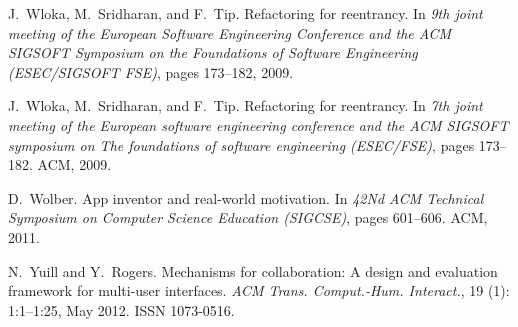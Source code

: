 \documentclass[article]{sigplanconf}
\begin{document}
\begin{thebibliography}{10}
J.~Wloka, M.~Sridharan, and F.~Tip.
\newblock Refactoring for reentrancy.
\newblock In \emph{9th joint meeting of the European Software Engineering
  Conference and the ACM SIGSOFT Symposium on the Foundations of Software
  Engineering (ESEC/SIGSOFT FSE)}, pages 173--182, 2009{}.

J.~Wloka, M.~Sridharan, and F.~Tip.
\newblock Refactoring for reentrancy.
\newblock In \emph{7th joint meeting of the European software engineering
  conference and the ACM SIGSOFT symposium on The foundations of software
  engineering (ESEC/FSE)}, pages 173--182. ACM, 2009{}.

D.~Wolber.
\newblock App inventor and real-world motivation.
\newblock In \emph{42Nd ACM Technical Symposium on Computer Science Education
  (SIGCSE)}, pages 601--606. ACM, 2011.

N.~Yuill and Y.~Rogers.
\newblock Mechanisms for collaboration: A design and evaluation framework for
  multi-user interfaces.
\newblock \emph{ACM Trans. Comput.-Hum. Interact.}, 19 (1):
  1:1--1:25, May 2012.
\newblock ISSN 1073-0516.

\end{thebibliography}
\end{document}
